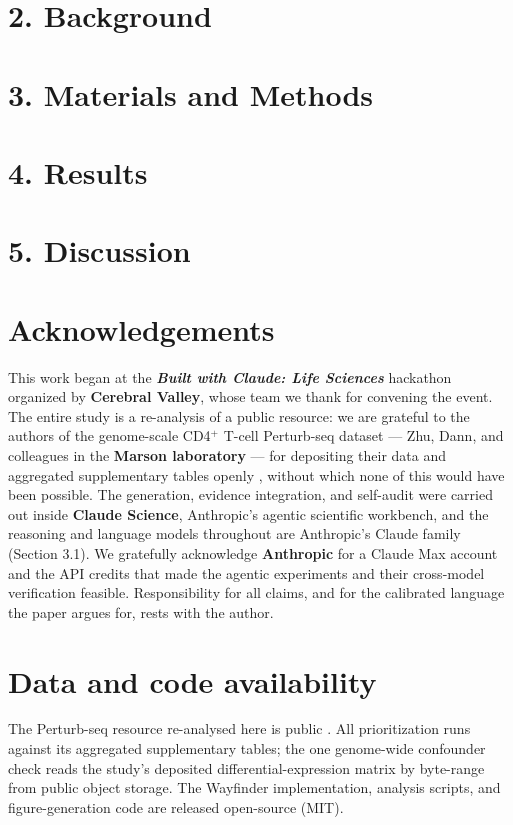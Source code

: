 \documentclass[11pt]{article}
\newcounter{none}
\begin{document}
\section*{2. Background}
\section*{3. Materials and Methods}
\section*{4. Results}
\section*{5. Discussion}

\section*{Acknowledgements}
This work began at the \textbf{\emph{Built with Claude: Life Sciences}} hackathon organized by
\textbf{Cerebral Valley}, whose team we thank for convening the event. The entire study is a re-analysis of a
public resource: we are grateful to the authors of the genome-scale CD4$^{+}$ T-cell Perturb-seq dataset ---
Zhu, Dann, and colleagues in the \textbf{Marson laboratory} --- for depositing their data and aggregated
supplementary tables openly \cite{zhu2025}, without which none of this would have been possible. The
generation, evidence integration, and self-audit were carried out inside \textbf{Claude Science}, Anthropic's
agentic scientific workbench, and the reasoning and language models throughout are Anthropic's Claude family
(Section 3.1). We gratefully acknowledge \textbf{Anthropic} for a Claude Max account and the API credits that
made the agentic experiments and their cross-model verification feasible. Responsibility for all claims,
and for the calibrated language the paper argues for, rests with the author.

\section*{Data and code availability}
The Perturb-seq resource re-analysed here is public \cite{zhu2025}. All prioritization runs against its
aggregated supplementary tables; the one genome-wide confounder check reads the study's deposited
differential-expression matrix by byte-range from public object storage. The Wayfinder implementation,
analysis scripts, and figure-generation code are released open-source (MIT).


\end{document}
